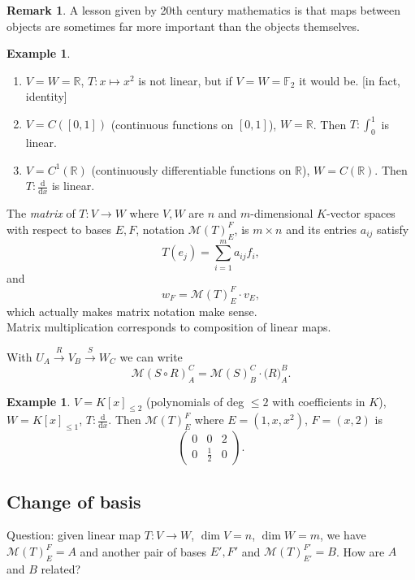 \documentclass[a4paper]{article}
\theoremstyle{definition}
\newtheorem{example}[defn]{Example}
\newtheorem*{remark}{Remark}
\begin{document}
\begin{remark}
	A lesson given by 20th century mathematics is that maps between objects are sometimes far more important than the objects themselves.
\end{remark}

\begin{example}
\begin{enumerate}
	\item $V=W=\mathbb R$, $T:x \mapsto x^2$ is not linear, but if $V=W=\mathbb F_2$ it would be. [in fact, identity]
	\item $V=C ([0,1])$ (continuous functions on $[0,1]$), $W=\mathbb R$. Then $T: \int_0^1$ is linear.
	\item $V=C^1 (\mathbb R)$ (continuously differentiable functions on $\mathbb R$), $W=C (\mathbb R)$. Then $T: \frac{\mathrm d}{\mathrm d x}$ is linear.
\end{enumerate}
\end{example}

The \textit{matrix} of $T:V\rightarrow W$ where $V,W$ are $n$ and $m$-dimensional $K$-vector spaces with respect to bases $E,F$, notation $\mathcal M(T)_E^F$, is $m\times n$ and its entries $a_{ij}$ satisfy
\[
T(e_j)=\sum_{i=1}^m a_{ij} f_i ,
\]
and
\[
w_F=\mathcal M (T)_E^F \cdot v_E ,
\]
which actually makes matrix notation make sense. \\

Matrix multiplication corresponds to composition of linear maps.

With $U_A \xrightarrow{R} V_B \xrightarrow{S} W_C$ we can write
\[
\mathcal M (S\circ R)_A^C = \mathcal M (S)_B^C \cdot \mathcal (R)_A^B .
\]

\begin{example}
	$V=K[x]_{\leq 2}$ (polynomials of deg $\leq 2$ with coefficients in $K$), $W=K[x]_{\leq 1}$, $T:\frac{\mathrm d}{\mathrm d x}$. Then $\mathcal M(T)_E^F$ where $E=(1,x,x^2)$, $F=(x,2)$ is
\[
\begin{pmatrix}
		0 & 0 & 2 \\ 0 & \frac12 & 0
	\end{pmatrix} .
\]
\end{example}

\subsection{Change of basis}
Question: given linear map $T:V \rightarrow W$, $\dim V=n$, $\dim W =m$, we have $\mathcal M(T)_E^F= A$ and another pair of bases $E',F'$ and $\mathcal M(T)_{E'}^{F'}= B$. How are $A$ and $B$ related?
\end{document}
